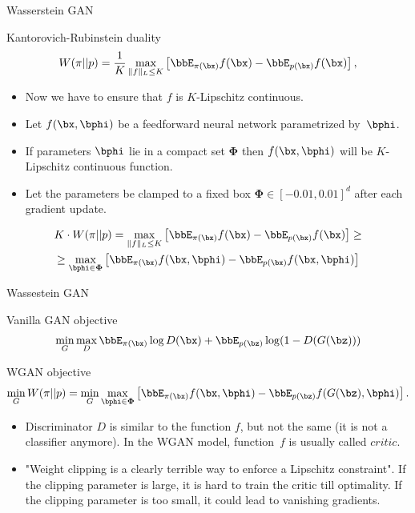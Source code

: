 \begin{frame}{Wasserstein GAN}
		\begin{block}{Kantorovich-Rubinstein duality}
		\[
			W(\pi || p) = \frac{1}{K} \max_{\| f \|_L \leq K} \left[ \bbE_{\pi(\bx)} f(\bx)  - \bbE_{p(\bx)} f(\bx)\right],
		\]
	\end{block}
	\begin{itemize}
		\item Now we have to ensure that $f$ is $K$-Lipschitz continuous.
		\item Let $f(\bx, \bphi)$ be a feedforward neural network parametrized by~$\bphi$.
		\item If parameters $\bphi$ lie in a compact set $\boldsymbol{\Phi}$ then $f(\bx, \bphi)$ will be $K$-Lipschitz continuous function. 
		\item Let the parameters be clamped to a fixed box $\boldsymbol{\Phi} \in [-0.01, 0.01]^d$ after each gradient update.
	\end{itemize}
	\begin{multline*}
		 K \cdot W(\pi || p) = \max_{\| f \|_L \leq K} \left[ \bbE_{\pi(\bx)} f(\bx)  - \bbE_{p(\bx)} f(\bx)\right] \geq \\  \geq \max_{\bphi \in \boldsymbol{\Phi}} \left[ \bbE_{\pi(\bx)} f(\bx, \bphi)  - \bbE_{p(\bx)} f(\bx, \bphi )\right]
	\end{multline*}

\end{frame}
\begin{frame}{Wassestein GAN}
	\begin{block}{Vanilla GAN objective}
		\vspace{-0.2cm}
		\[
			\min_{G} \max_D \bbE_{\pi(\bx)} \log D(\bx) + \bbE_{p(\bz)} \log (1 - D(G(\bz)))
		\]
		\vspace{-0.2cm}
	\end{block}
	\begin{block}{WGAN objective}
		\vspace{-0.6cm}
		\[
		\min_{G} W(\pi || p) = \min_{G} \max_{\bphi \in \boldsymbol{\Phi}} \left[ \bbE_{\pi(\bx)} f(\bx, \bphi)  - \bbE_{p(\bz)} f(G(\bz), \bphi )\right].
		\]
	\end{block}
	\begin{itemize}
		\item Discriminator $D$ is similar to the function $f$, but not the same (it is not a classifier anymore). In the WGAN model, function~$f$ is usually called $\textit{critic}$.
		\item "Weight clipping is a clearly terrible way to enforce a Lipschitz constraint". If the clipping parameter is large, it is hard to train the critic till optimality. If the clipping parameter is too small, it could lead to vanishing gradients.
	\end{itemize}

\end{frame}
